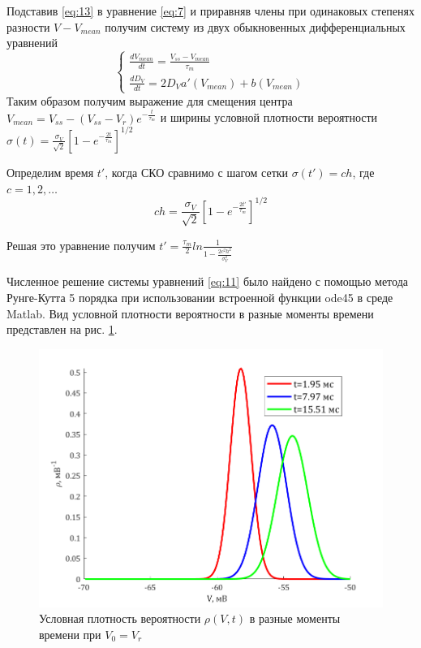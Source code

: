 Подставив \eqref{eq:13} в уравнение \eqref{eq:7} и приравняв члены при одинаковых степенях разности $V-V_{mean}$ получим систему из двух обыкновенных дифференциальных уравнений
\begin{equation}
\begin{cases}
\displaystyle \frac{dV_{mean}}{dt}=\frac{V_{ss}-V_{mean}}{\tau_m} \\
\displaystyle \frac{dD_V}{dt}=2D_Va'(V_{mean})+b(V_{mean})
\end{cases}
\label{eq:15}
\end{equation}
Таким образом получим выражение для смещения центра $\displaystyle V_{mean}=V_{ss}-(V_{ss}-V_r)e^{-\frac{t}{\tau_m}}$ и ширины условной плотности вероятности $\displaystyle \sigma(t)=\frac{\sigma_V}{\sqrt{2}}\left[1-e^{-\frac{2t}{\tau_m}}\right]^{1/2}$

Определим время $t'$, когда СКО сравнимо с шагом сетки $\sigma(t')=ch$, где $c=1,2,\ldots$
\begin{equation}
	ch=\frac{\sigma_V}{\sqrt{2}}\left[1-e^{-\frac{2t'}{\tau_m}}\right]^{1/2}
	\label{eq:16}
\end{equation}

Решая это уравнение получим $\displaystyle t'=\frac{\tau_m}{2}ln\frac{1}{1-\frac{2c^2h^2}{\sigma_V^2}}$

Численное решение системы уравнений \eqref{eq:11} было найдено с помощью метода Рунге-Кутта 5 порядка при использовании встроенной функции ode45 в среде Matlab. Вид условной плотности вероятности в разные моменты времени представлен на рис. \ref{pic:1}.
\begin{figure}[H]
	\centering
	\includegraphics[width=\linewidth]{pic/rho.png}
	\caption{Условная плотность вероятности $\rho(V,t)$  в разные моменты времени при $V_0=V_r$}
	\label{pic:1}
\end{figure}

